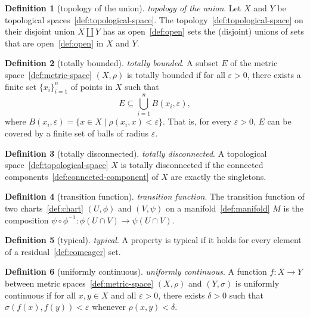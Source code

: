 \documentclass[12pt,a4paper]{article}
\theoremstyle{definition}
\newtheorem{definition}{Definition}
\begin{document}
\begin{definition}[topology of the union]\label{def:topology-of-the-union}
\emph{topology of the union}. Let $X$ and $Y$ be topological spaces~\ref{def:topological-space}. The topology~\ref{def:topological-space} on their disjoint union $X\amalg Y$ has as open~\ref{def:open} sets the (disjoint) unions of sets that are open~\ref{def:open} in $X$ and $Y$.
\end{definition}

\begin{definition}[totally bounded]\label{def:totally-bounded}
\emph{totally bounded}. A subset $E$ of the metric space~\ref{def:metric-space} $(X,\rho)$ is totally bounded if for all $\varepsilon > 0$, there exists a finite set $\{x_i\}_{i=1}^n$ of points in $X$ such that $$E \subseteq \bigcup_{i=1}^n B(x_i, \varepsilon),$$ where $B(x_i, \varepsilon) = \{x \in X \mid \rho(x_i,x)< \varepsilon\}.$ That is, for every $\varepsilon > 0$, $E$ can be covered by a finite set of balls of radius $\varepsilon$.
\end{definition}

\begin{definition}[totally disconnected]\label{def:totally-disconnected}
\emph{totally disconnected}. A topological space~\ref{def:topological-space} $X$ is totally disconnected if the connected components~\ref{def:connected-component} of $X$ are exactly the singletons.
\end{definition}

\begin{definition}[transition function]\label{def:transition-function}
\emph{transition function}. The transition function of two charts~\ref{def:chart} $(U,\phi)$ and $(V, \psi)$ on a manifold~\ref{def:manifold} $M$ is the composition $\psi \circ \phi^{-1}: \phi(U\cap V)\to \psi(U\cap V)$.
\end{definition}

\begin{definition}[typical]\label{def:typical}
\emph{typical}. A property is typical if it holds for every element of a residual~\ref{def:comeager} set.
\end{definition}

\begin{definition}[uniformly continuous]\label{def:uniformly-continuous}
\emph{uniformly continuous}. A function $f:X\to Y$ between metric spaces~\ref{def:metric-space} $(X,\rho)$ and $(Y, \sigma)$ is uniformly continuous if for all $x,y \in X$ and all $\varepsilon > 0$, there exists $\delta > 0$ such that $\sigma(f(x), f(y)) < \varepsilon$ whenever $\rho(x,y) < \delta$.
\end{definition}
\end{document}
